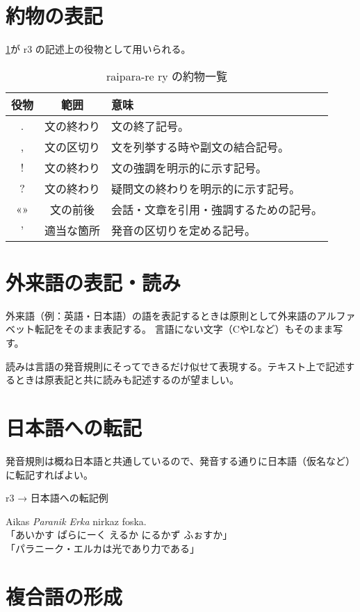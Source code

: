 \section{約物の表記}

\cref{table:list-of-punctuation}が r3 の記述上の役物として用いられる。

\begin{table}[H]
    \centering
    \caption{raipara-re ry の約物一覧}
    \label{table:list-of-punctuation}
    \begin{tabular}{ccl}
        \toprule
        役物 & 範囲 & 意味 \\
        \midrule
        .  & 文の終わり & 文の終了記号。 \\
        ,  & 文の区切り & 文を列挙する時や副文の結合記号。 \\
        !  & 文の終わり & 文の強調を明示的に示す記号。 \\
        ?  & 文の終わり & 疑問文の終わりを明示的に示す記号。 \\
        «» & 文の前後  & 会話・文章を引用・強調するための記号。 \\
        '  & 適当な箇所 & 発音の区切りを定める記号。 \\
        \bottomrule
    \end{tabular}
\end{table}

\section{外来語の表記・読み}

外来語（例：英語・日本語）の語を表記するときは原則として外来語のアルファベット転記をそのまま表記する。
言語にない文字（CやLなど）もそのまま写す。

読みは言語の発音規則にそってできるだけ似せて表現する。テキスト上で記述するときは原表記と共に読みも記述するのが望ましい。

\section{日本語への転記}

発音規則は概ね日本語と共通しているので、発音する通りに日本語（仮名など）に転記すればよい。

\begin{itembox}[l]{r3 → 日本語への転記例}
    \begin{pindent}
        \noindent
        Aikas \emph{Paranik Erka} nirkaz foska. \\
        「あいかす ぱらにーく えるか にるかず ふぉすか」 \\
        「パラニーク・エルカは光であり力である」
    \end{pindent}
\end{itembox}

\section{複合語の形成}